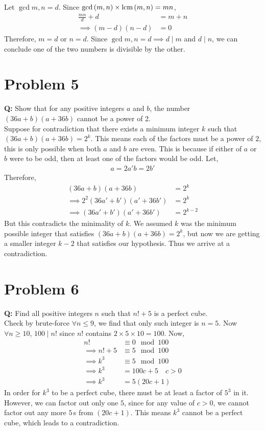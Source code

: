 Let $\gcd{m,n}=d$. Since $\text{gcd}\left(m,n\right)\times \text{lcm}\left(m,n\right)=mn$,
\begin{align*}
    \frac{mn}{d} + d    & = m + n \\
    \implies (m-d)(n-d) & =0
\end{align*}
Therefore, $m=d$ or $n=d$. Since $\gcd{m,n}=d \implies d\mid m$ and $d \mid n$, we can conclude one of the two numbers is divisible by the other.

\section*{Problem 5}
\textbf{Q:} Show that for any positive integers $a$ and $b$, the number $(36a + b)(a + 36b)$ cannot be a power of 2.\\

Suppose for contradiction that there exists a minimum integer $k$ such that $(36a+b)(a+36b)=2^k$. This means each of the factors must be a power of $2$, this is only possible when both $a$ and $b$ are even. This is because if either of $a$ or $b$ were to be odd, then at least one of the factors would be odd. Let,
\begin{align*}
    a = 2a'
    b = 2b'
\end{align*}
Therefore,
\begin{align*}
    (36a+b)(a+36b)                 & =2^k     \\
    \implies 2^2(36a'+b')(a'+36b') & =2^k     \\
    \implies (36a'+b')(a'+36b')    & =2^{k-2}
\end{align*}
But this contradicts the minimality of $k$. We assumed $k$ was the minimum possible integer that satisfies $(36a+b)(a+36b)=2^k$, but now we are getting a smaller integer $k-2$ that satisfies our hypothesis. Thus we arrive at a contradiction.
\section*{Problem 6}
\textbf{Q:} Find all positive integers $n$ such that $n!+5$ is a perfect cube.\\

Check by brute-force $\forall n \leq 9$, we find that only such integer is $n=5$. Now $\forall n \geq 10$, $100 \mid n!$ since $n!$ contains $2\times5\times10=100$. Now,
\begin{align*}
    n!            & \equiv 0 \mod{100}   \\
    \implies n!+5 & \equiv5\mod{100}     \\
    \implies k^3  & \equiv 5\mod{100}    \\
    \implies k^3  & = 100c + 5 \quad c>0 \\
    \implies k^3  & = 5(20c+1)
\end{align*}
In order for $k^3$ to be a perfect cube, there must be at least a factor of $5^3$ in it. However, we can factor out only one $5$, since for any value of $c>0$, we cannot factor out any more $5\,$s from $(20c+1)$. This means $k^3$ cannot be a perfect cube, which leads to a contradiction.

